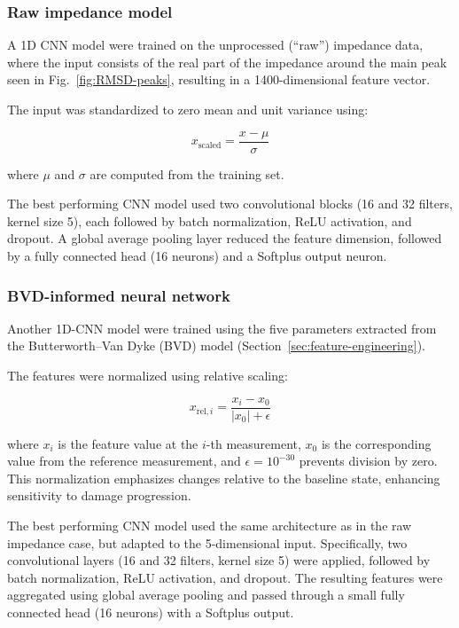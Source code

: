 \documentclass[journal,twoside,web]{ieeecolor}
\begin{document}
\subsubsection{Raw impedance model}

A 1D CNN model were trained on the unprocessed (“raw”) impedance data, where the input consists of the real part of the impedance around the main peak seen in Fig.~\ref{fig:RMSD-peaks}, resulting in a 1400-dimensional feature vector.

The input was standardized to zero mean and unit variance using:

\begin{equation}
x_{\mathrm{scaled}} = \frac{x - \mu}{\sigma}
\end{equation}

where $\mu$ and $\sigma$ are computed from the training set.

The best performing CNN model used two convolutional blocks (16 and 32 filters, kernel size 5), each followed by batch normalization, ReLU activation, and dropout. A global average pooling layer reduced the feature dimension, followed by a fully connected head (16 neurons) and a Softplus output neuron.

\subsubsection{BVD-informed neural network}

Another 1D-CNN model were trained using the five parameters extracted from the Butterworth–Van Dyke (BVD) model (Section~\ref{sec:feature-engineering}).

The features were normalized using relative scaling:

\begin{equation} 
    x_{\mathrm{rel},i} = \frac{x_i - x_{0}}{|x_{0}| + \epsilon} 
    \label{eq:rel-scaler}
\end{equation}

where $x_i$ is the feature value at the $i$-th measurement, $x_0$ is the corresponding value from the reference measurement, and $\epsilon = 10^{-30}$ prevents division by zero. This normalization emphasizes changes relative to the baseline state, enhancing sensitivity to damage progression.

The best performing CNN model used the same architecture as in the raw impedance case, but adapted to the 5-dimensional input. Specifically, two convolutional layers (16 and 32 filters, kernel size 5) were applied, followed by batch normalization, ReLU activation, and dropout. The resulting features were aggregated using global average pooling and passed through a small fully connected head (16 neurons) with a Softplus output.
\end{document}
